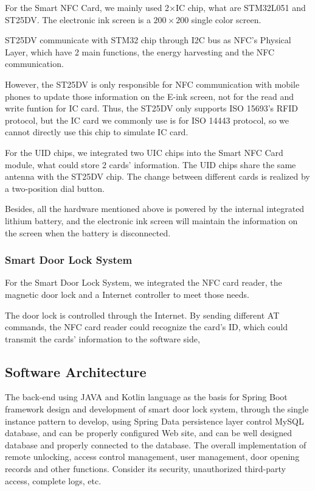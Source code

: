 \documentclass[11pt, a4paper]{article}
\begin{document}
For the Smart NFC Card, we mainly used 2$\times$IC chip, what are STM32L051 and ST25DV. The electronic ink screen is a $200 \times 200$ single color screen.

ST25DV communicate with STM32 chip through I2C bus as NFC's Physical Layer, which have 2 main functions, the energy harvesting and the NFC communication.

However, the ST25DV is only responsible for NFC communication with mobile phones to update those information on the E-ink screen, not for the read and write funtion for IC card. Thus, the ST25DV only supports ISO 15693's RFID protocol, but the IC card we commonly use is for ISO 14443 protocol, so we cannot directly use this chip to simulate IC card.

For the UID chips, we integrated two UIC chips into the Smart NFC Card module, what could store 2 cards' information. The UID chips share the same antenna with the ST25DV chip. The change between different cards is realized by a two-position dial button.

Besides, all the hardware mentioned above is powered by the internal integrated lithium battery, and the electronic ink screen will maintain the information on the screen when the battery is disconnected.

\subsubsection{Smart Door Lock System}

For the Smart Door Lock System, we integrated the NFC card reader, the magnetic door lock and a Internet controller to meet those needs.

The door lock is controlled through the Internet. By sending different AT commands, the NFC card reader could recognize the card's ID, which could transmit the cards' information to the software side, 


\subsection{Software Architecture}
The back-end using JAVA and Kotlin language as the basis for Spring Boot framework design and development of smart door lock system, through the single instance pattern to develop, using Spring Data persistence layer control MySQL database, and can be properly configured Web site, and can be well designed database and properly connected to the database.  The overall implementation of remote unlocking, access control management, user management, door opening records and other functions.  Consider its security, unauthorized third-party access, complete logs, etc.
\end{document}
